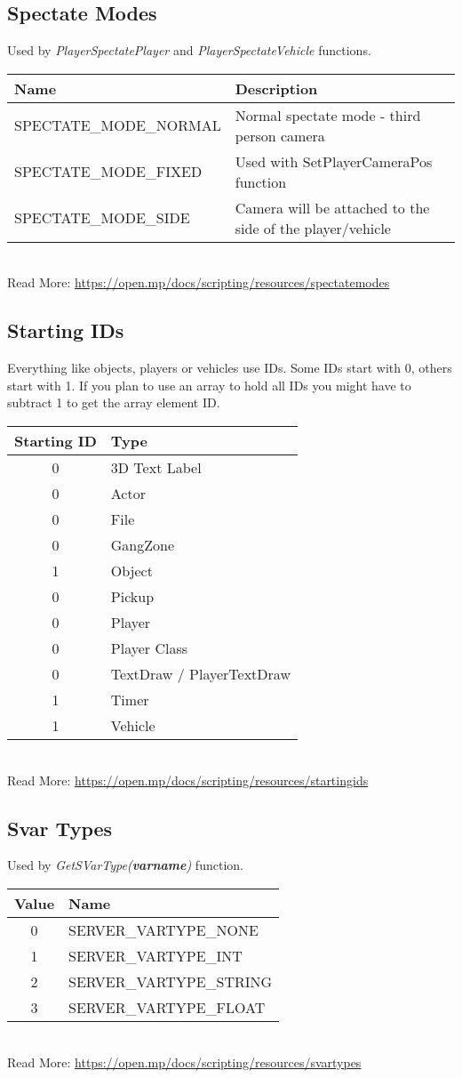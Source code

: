 \documentclass{article}
\begin{document}
\subsection{Spectate Modes}
Used by \textit{PlayerSpectatePlayer} and \textit{PlayerSpectateVehicle} functions.
\bigskip
\\\begin{tabular}{ |l|l| }
\hline
Name & Description \\
\hline
SPECTATE\_MODE\_NORMAL & Normal spectate mode - third person camera \\
SPECTATE\_MODE\_FIXED & Used with SetPlayerCameraPos function \\
SPECTATE\_MODE\_SIDE & Camera will be attached to the side of the player/vehicle \\
\hline
\end{tabular}
\bigskip
\\Read More: \url{https://open.mp/docs/scripting/resources/spectatemodes}


\newpage
\subsection{Starting IDs}
Everything like objects, players or vehicles use IDs. Some IDs start with 0, others start with 1. If you plan to use an array to hold all IDs you might have to subtract 1 to get the array element ID.
\bigskip
\\\begin{tabular}{ |c|l| }
\hline
Starting ID & Type \\
\hline
0 & 3D Text Label \\
0 & Actor \\
0 & File \\
0 & GangZone \\
1 & Object \\
0 & Pickup \\
0 & Player \\
0 & Player Class \\
0 & TextDraw / PlayerTextDraw \\
1 & Timer \\
1 & Vehicle \\
\hline
\end{tabular}
\bigskip
\\Read More: \url{https://open.mp/docs/scripting/resources/startingids}

\subsection{Svar Types}
Used by \textit{GetSVarType(\textbf{varname})} function.
\bigskip
\\\begin{tabular}{ |c|l| }
\hline
Value & Name \\
\hline
0 & SERVER\_VARTYPE\_NONE \\
1 & SERVER\_VARTYPE\_INT \\
2 & SERVER\_VARTYPE\_STRING \\
3 & SERVER\_VARTYPE\_FLOAT \\
\hline
\end{tabular}
\bigskip
\\Read More: \url{https://open.mp/docs/scripting/resources/svartypes}
\end{document}
